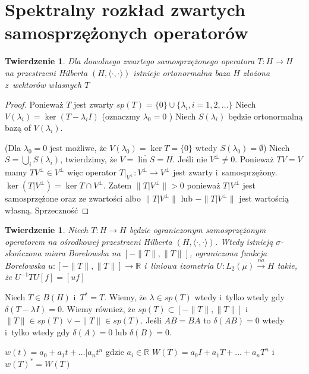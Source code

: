 \documentclass[11pt]{mwrep}
\renewcommand{\[}{\begin{equation}}
\renewcommand{\]}{\end{equation}}
\newcommand{\R}{{\ensuremath{\mathbb R}}}
\newcommand{\lin}{\operatorname{lin}}
\newcommand{\scal}{\langle \cdot,\cdot \rangle}
\newtheorem{twr}[subsection]{Twierdzenie}%
\begin{document}
\section{Spektralny rozkład zwartych samosprzężonych operatorów}
\begin{twr}
	Dla dowolnego zwartego samosprzężonego operatora $T\colon H \to H$ na przestrzeni Hilberta $(H, \scal)$ istnieje ortonormalna baza
	$H$ złożona z~wektorów własnych $T$ 
\end{twr}
\begin{proof}
	Ponieważ $T$ jest zwarty $sp(T) = \{0\} \cup \{\lambda_i, i= 1,2,\ldots \}$
	Niech $V(\lambda_i) = \ker (T-\lambda_i I) $ (oznaczmy $\lambda_0 = 0$ )
	Niech $S(\lambda_i)$ będzie ortonormalną bazą of $V(\lambda_i)$.

	(Dla $\lambda_0 = 0$ jest możliwe, że $V(\lambda_0) = \ker T = \{0\}$ wtedy $S(\lambda_0) = \emptyset$)
 Niech $S = \bigcup_i S(\lambda_i)$, twierdzimy, że $V = \overline{\lin S}  =H$.
 Jeśli nie $V^\perp \not = 0$. Ponieważ $TV = V$ mamy $TV^\perp  \in V^\perp$ więc operator 
 $T|_{V^\perp} \colon V^\perp \to V^\perp$ jest zwarty i~samosprzężony. 
 $\ker(T|V^\perp) = \ker T \cap V^\perp$. 
 Zatem $\|T|V^\perp\|>0$ ponieważ $T|V^\perp$ jest samosprzężone oraz ze zwartości albo $\|T|V^\perp\|$ lub $-\|T |V^\perp\|$ jest wartością własną.
 Sprzeczność

\end{proof}
\begin{twr}
	Niech $T\colon H \to H$ będzie ograniczonym samosprzężonym operatorem na ośrodkowej przestrzeni Hilberta $(H ,\scal)$.
	Wtedy istnieją $\sigma$-skończona miara Borelowska na $[-\|T\|, \|T\|]$, ograniczona funkcja Borelowska $u\colon[-\|T\|,\|T\|] \to \R$
	i~liniowa izometria $U\colon L_2 (\mu) \stackrel{na}{\to} H$ takie, że $U^{-1}TU[f] = [uf]$
\end{twr}
	Niech $T\in B(H)$ i~$T^*=T$.
	Wiemy, że $\lambda \in sp(T)$ wtedy i~tylko wtedy gdy $\delta(T - \lambda I) =0$.
	Wiemy również, że $sp(T) \subset \left[ -\|T\|, \|T\| \right]$ i~$\|T\|\in sp(T) \lor -\|T\| \in sp(T)$.
	Jeśli $AB=BA$ to $\delta(AB) =0$ wtedy i~tylko wtedy gdy $\delta(A) =0 $ lub $\delta(B) = 0$.\par
	$w(t)  = a_0 + a_1 t +\ldots | a_n t^n$ gdzie $a_i \in \R$ 
	$W(T) = a_0 I + a_1 T +\ldots+ a_n T^n$ i~$w(T)^* = W(T)$
\end{document}
